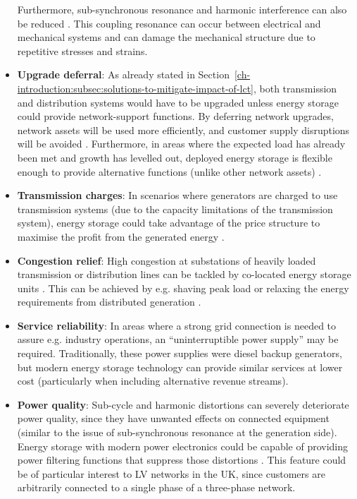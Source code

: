 \begin{itemize}
Furthermore, sub-synchronous resonance and harmonic interference can also be reduced \cite{Wang1994}.
This coupling resonance can occur between electrical and mechanical systems and can damage the mechanical structure due to repetitive stresses and strains.
\item
\textbf{Upgrade deferral}: As already stated in Section~\ref{ch-introduction:subsec:solutions-to-mitigate-impact-of-lct}, both transmission and distribution systems would have to be upgraded unless energy storage could provide network-support functions.
By deferring network upgrades, network assets will be used more efficiently, and customer supply disruptions will be avoided \cite{Sayer2007, Eyer2010a}.
Furthermore, in areas where the expected load has already been met and growth has levelled out, deployed energy storage is flexible enough to provide alternative functions (unlike other network assets) \cite{Huff2013}.
\item
\textbf{Transmission charges}: In scenarios where generators are charged to use transmission systems (due to the capacity limitations of the transmission system), energy storage could take advantage of the price structure to maximise the profit from the generated energy \cite{Sayer2007, Leou2012}.
\item
\textbf{Congestion relief}: High congestion at substations of heavily loaded transmission or distribution lines can be tackled by co-located energy storage units \cite{Saez-de-Ibarra2013a, Kulkarni2005}.
This can be achieved by e.g. shaving peak load or relaxing the energy requirements from distributed generation \cite{Reihani2016, Gerards2016d}.
\item
\textbf{Service reliability}: In areas where a strong grid connection is needed to assure e.g. industry operations, an ``uninterruptible power supply'' may be required.
Traditionally, these power supplies were diesel backup generators, but modern energy storage technology can provide similar services at lower cost \cite{Schoenung2001} (particularly when including alternative revenue streams).
\item
\textbf{Power quality}: Sub-cycle and harmonic distortions can severely deteriorate power quality, since they have unwanted effects on connected equipment (similar to the issue of sub-synchronous resonance at the generation side).
Energy storage with modern power electronics could be capable of providing power filtering functions that suppress those distortions \cite{Putrus2007}.
This feature could be of particular interest to LV networks in the UK, since customers are arbitrarily connected to a single phase of a three-phase network.

\end{itemize}
